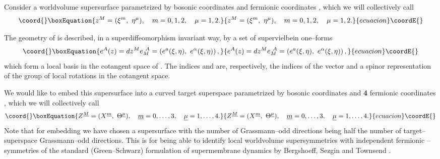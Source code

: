 \documentclass[a4paper,12pt]{article}
\begin{document}
Consider a worldvolume supersurface \coordHE{} parametrized by
\coordHE{} bosonic coordinates \coordHE{} and \coordHE{} fermionic
coordinates \myHighlight{$\eta^\mu$}\coordHE{}, which we will collectively call
\begin{equation}\coord{}\boxEquation{\label{z}
z^M=(\xi^m,~\eta^\mu), \quad m=0,1,2, \quad \mu=1,2.
}{z^M=(\xi^m,~\eta^\mu), \quad m=0,1,2, \quad \mu=1,2.
}{ecuacion}\coordE{}\end{equation}

The geometry of \coordHE{} is described, in a superdiffeomorphism
invariant way, by a set of supervielbein one--forms
\begin{equation}\coord{}\boxEquation{\label{e}
e^A(z)=dz^Me^{~A}_M=\left(e^a(\xi,\eta),~e^\alpha(\xi,\eta)\right),
}{e^A(z)=dz^Me^{~A}_M=\left(e^a(\xi,\eta),~e^\alpha(\xi,\eta)\right),
}{ecuacion}\coordE{}\end{equation}
which form a local basis in the cotangent space of \coordHE{}. The
indices \coordHE{} and \myHighlight{$\alpha$}\coordHE{} are, respectively, the indices of the
vector and a spinor representation of the group \coordHE{} of local
rotations in the cotangent space.

We would like to embed this supersurface into a curved target
superspace
\coordHE{} parametrized by \coordHE{} bosonic coordinates
\coordHE{} and {\bf 4} fermionic coordinates
\myHighlight{$\Theta^{\underline\mu}$}\coordHE{}, which we will collectively call
\begin{equation}\coord{}\boxEquation{\label{Z}
Z^{\underline M}=(X^{\underline m},~\Theta^{\underline\mu}), \quad
\underline m=0,\dots,3, \quad \underline\mu=1,\dots,4.
}{Z^{\underline M}=(X^{\underline m},~\Theta^{\underline\mu}), \quad
\underline m=0,\dots,3, \quad \underline\mu=1,\dots,4.
}{ecuacion}\coordE{}\end{equation}
Note that for embedding we have chosen a supersurface with the
number of Grassmann--odd directions being half the number of
target--superspace Grass\-mann--odd directions. This is for being
able to identify \coordHE{} local worldvolume supersymmetries with
\coordHE{} independent fermionic \myHighlight{$\kappa$}\coordHE{}--symmetries of the standard
(Green--Schwarz) formulation of supermembrane dynamics by
Bergshoeff, Sezgin and Townsend \cite{bst1}.
\end{document}

